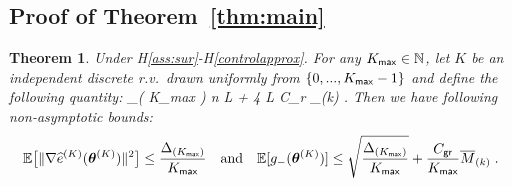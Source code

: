 \documentclass[final,12pt]{alt2022} %
\newtheorem*{Theorem*}{Theorem}
\begin{document}
\subsection{Proof of Theorem~\ref{thm:main}}
\begin{Theorem*}
Under H\ref{ass:sur}-H\ref{controlapprox}. For any $K_{\sf max} \in \NN$, let $K$ be an independent discrete r.v.~drawn uniformly from $\{0,...,K_{\sf max}-1\}$ and define the following quantity:
\beq\notag
\Delta_{( K_{\sf max} )}  n L  +  4 L C_{\sf r} _{(k)} \eqsp.
\eeq
Then we have following non-asymptotic bounds:
\begin{align} \notag
 \EE \big[ \| \grd \eSur{K}{\hp{K}} \|^2 \big]  \leq \frac{\Delta_{( K_{\sf max} )}}{K_{\sf max}} \quad \textrm{and} \quad \EE[ g_-( \hp{K} ) ]  \leq \sqrt{\frac{ \Delta_{( K_{\sf max} )} }{ K_{\sf max} }} + \frac{C_{\sf gr}}{K_{\sf max}}  \overline{M}_{(k)} \eqsp.
\end{align}
\end{Theorem*}
\end{document}
